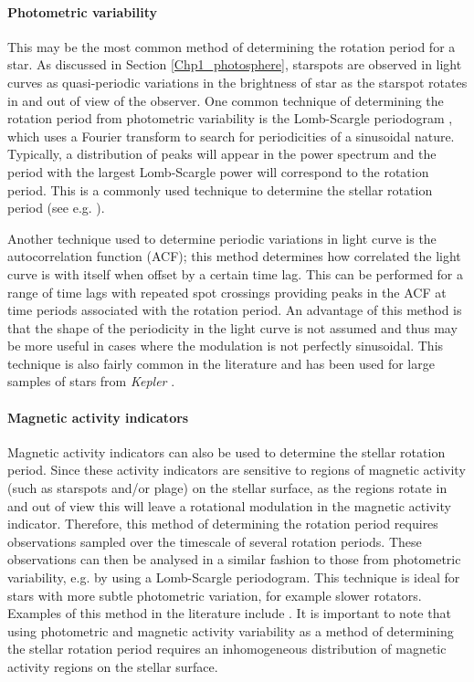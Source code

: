 \paragraph{Photometric variability}
This may be the most common method of determining the rotation period for a star. As discussed in Section \ref{Chp1_photosphere}, starspots are observed in light curves as quasi-periodic variations in the brightness of star as the starspot rotates in and out of view of the observer. One common technique of determining the rotation period from photometric variability is the Lomb-Scargle periodogram \citep{Lomb_1976,Scargle_1982}, which uses a Fourier transform to search for periodicities of a sinusoidal nature. Typically, a distribution of peaks will appear in the power spectrum and the period with the largest Lomb-Scargle power will correspond to the rotation period. This is a commonly used technique to determine the stellar rotation period (see e.g. \citealt{do_Nascimento_etal_2014,Nielsen_etal_2013}).

Another technique used to determine periodic variations in light curve is the autocorrelation function (ACF); this method determines how correlated the light curve is with itself when offset by a certain time lag. This can be performed for a range of time lags with repeated spot crossings providing peaks in the ACF at time periods associated with the rotation period. An advantage of this method is that the shape of the periodicity in the light curve is not assumed and thus may be more useful in cases where the modulation is not perfectly sinusoidal. This technique is also fairly common in the literature and has been used for large samples of stars from \textit{Kepler} \citep{McQuillan_etal_2014}.

\paragraph{Magnetic activity indicators}
Magnetic activity indicators can also be used to determine the stellar rotation period. Since these activity indicators are sensitive to regions of magnetic activity (such as starspots and/or plage) on the stellar surface, as the regions rotate in and out of view this will leave a rotational modulation in the magnetic activity indicator. Therefore, this method of determining the rotation period requires observations sampled over the timescale of several rotation periods. These observations can then be analysed in a similar fashion to those from photometric variability, e.g. by using a Lomb-Scargle periodogram. This technique is ideal for stars with more subtle photometric variation, for example slower rotators. Examples of this method in the literature include \citet{DeWarf_etal_2010,Robertson_etal_2015_GJ176,Boro_Saikia_etal_2016,Hempelmann_etal_2016}. It is important to note that using photometric and magnetic activity variability as a method of determining the stellar rotation period requires an inhomogeneous distribution of magnetic activity regions on the stellar surface.

